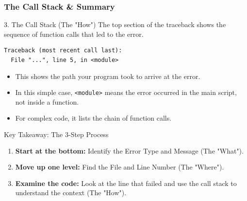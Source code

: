 \documentclass{beamer}
\begin{document}
\begin{frame}[fragile]
    \frametitle{The Call Stack \& Summary}
    
    \begin{block}{3. The Call Stack (The "How")}
        The top section of the traceback shows the sequence of function calls that led to the error.
\begin{verbatim}
Traceback (most recent call last):
  File "...", line 5, in <module>
\end{verbatim}
        \begin{itemize}
            \item This shows the path your program took to arrive at the error.
            \item In this simple case, \texttt{<module>} means the error occurred in the main script, not inside a function.
            \item For complex code, it lists the chain of function calls.
        \end{itemize}
    \end{block}
    
    \begin{alertblock}{Key Takeaway: The 3-Step Process}
        \begin{enumerate}
            \item \textbf{Start at the bottom:} Identify the \alert{Error Type} and Message (The "What").
            \item \textbf{Move up one level:} Find the \alert{File and Line Number} (The "Where").
            \item \textbf{Examine the code:} Look at the line that failed and use the call stack to understand the context (The "How").
        \end{enumerate}
    \end{alertblock}
\end{frame}
\end{document}
